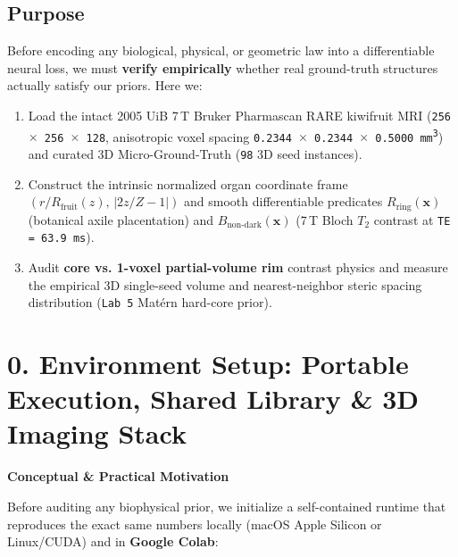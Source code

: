 \documentclass[10pt,a4paper]{article}
\renewcommand{\_}{\origunderscore\allowbreak}
\begin{document}
\subsection*{Purpose}
Before encoding any biological, physical, or geometric law into a differentiable neural loss, we must \textbf{verify empirically} whether real ground-truth structures actually satisfy our priors. Here we:
\begin{enumerate}
\item Load the intact 2005 UiB 7\,T Bruker Pharmascan RARE kiwifruit MRI (\texttt{256 $\times$ 256 $\times$ 128}, anisotropic voxel spacing \texttt{0.2344 $\times$ 0.2344 $\times$ 0.5000 mm\textsuperscript{3}}) and curated 3D Micro-Ground-Truth (\texttt{98} 3D seed instances).
\item Construct the intrinsic normalized organ coordinate frame $(r/R_{\text{fruit}}(z),\, |2z/Z - 1|)$ and smooth differentiable predicates $R_{\text{ring}}(\mathbf{x})$ (botanical axile placentation) and $B_{\text{non-dark}}(\mathbf{x})$ (7\,T Bloch $T_2$ contrast at \texttt{TE = 63.9 ms}).
\item Audit \textbf{core vs. 1-voxel partial-volume rim} contrast physics and measure the empirical 3D single-seed volume and nearest-neighbor steric spacing distribution (\texttt{Lab 5} Mat\'ern hard-core prior).
\end{enumerate}

\section*{0. Environment Setup: Portable Execution, Shared Library \& 3D Imaging Stack}

\begin{guidehdr}
{\small\bfseries\color{kiwigreen!75!black}Conceptual \& Practical Motivation}
\end{guidehdr}
Before auditing any biophysical prior, we initialize a self-contained runtime that reproduces the exact same numbers locally (macOS Apple Silicon or Linux/\allowbreak{}CUDA) and in \textbf{Google Colab}:
\end{document}

